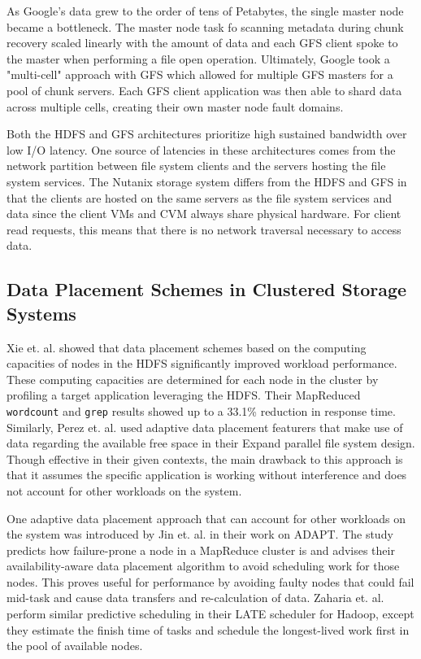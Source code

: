 \documentclass[12pt]{article}
\begin{document}
  As Google's data grew to the order of tens of Petabytes, the single master
  node became a bottleneck. The master node task fo scanning metadata during
  chunk recovery scaled linearly with the amount of data and each GFS client
  spoke to the master when performing a file open operation. Ultimately, Google
  took a "multi-cell" approach with GFS which allowed for multiple GFS masters
  for a pool of chunk servers. Each GFS client application was then able to
  shard data across multiple cells, creating their own master node fault
  domains.

  Both the HDFS and GFS architectures prioritize high sustained bandwidth over
  low I/O latency. One source of latencies in these architectures comes from
  the network partition between file system clients and the servers hosting the
  file system services. The Nutanix storage system differs from the HDFS and
  GFS in that the clients are hosted on the same servers as the file system
  services and data since the client VMs and CVM always share physical
  hardware. For client read requests, this means that there is no network
  traversal necessary to access data.

  \subsection{Data Placement Schemes in Clustered Storage Systems}
  \label{sec:priorwork}

  Xie et. al. \cite{xie2010} showed that data placement schemes based on the
  computing capacities of nodes in the HDFS significantly improved workload
  performance. These computing capacities are determined for each node in the
  cluster by profiling a target application leveraging the HDFS. Their
  MapReduced \texttt{wordcount} and \texttt{grep} results showed up to a 33.1\%
  reduction in response time. Similarly, Perez et. al. \cite{perez2003} used
  adaptive data placement featurers that make use of data regarding the
  available free space in their Expand parallel file system design.  Though
  effective in their given contexts, the main drawback to this approach is that
  it assumes the specific application is working without interference and does
  not account for other workloads on the system.

  One adaptive data placement approach that can account for other workloads on
  the system was introduced by Jin et. al. \cite{adapt2012} in their work on
  ADAPT. The study predicts how failure-prone a node in a MapReduce cluster is
  and advises their availability-aware data placement algorithm to avoid
  scheduling work for those nodes. This proves useful for performance by
  avoiding faulty nodes that could fail mid-task and cause data transfers and
  re-calculation of data. Zaharia et. al. \cite{zaharia2008} perform similar
  predictive scheduling in their LATE scheduler for Hadoop, except they
  estimate the finish time of tasks and schedule the longest-lived work first
  in the pool of available nodes.
\end{document}

